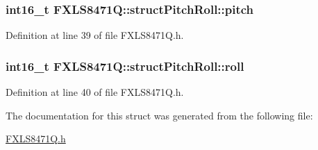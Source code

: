 \subsubsection[{\texorpdfstring{pitch}{pitch}}]{\setlength{\rightskip}{0pt plus 5cm}int16\+\_\+t F\+X\+L\+S8471\+Q\+::struct\+Pitch\+Roll\+::pitch}\hypertarget{struct_f_x_l_s8471_q_1_1struct_pitch_roll_a791ce9465df778f0d9d427e385846339}{}\label{struct_f_x_l_s8471_q_1_1struct_pitch_roll_a791ce9465df778f0d9d427e385846339}


Definition at line 39 of file F\+X\+L\+S8471\+Q.\+h.

\subsubsection[{\texorpdfstring{roll}{roll}}]{\setlength{\rightskip}{0pt plus 5cm}int16\+\_\+t F\+X\+L\+S8471\+Q\+::struct\+Pitch\+Roll\+::roll}\hypertarget{struct_f_x_l_s8471_q_1_1struct_pitch_roll_a5e5050027616d5b16db640a74e31ce2f}{}\label{struct_f_x_l_s8471_q_1_1struct_pitch_roll_a5e5050027616d5b16db640a74e31ce2f}


Definition at line 40 of file F\+X\+L\+S8471\+Q.\+h.



The documentation for this struct was generated from the following file\+:\begin{DoxyCompactItemize}
\item 
\hyperlink{_f_x_l_s8471_q_8h}{F\+X\+L\+S8471\+Q.\+h}\end{DoxyCompactItemize}
